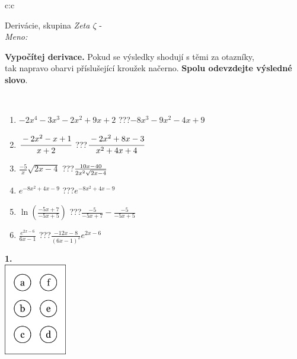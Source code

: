 \documentclass[10pt]{report}
\begin{document}
\begin{tabular}{c:c}
\begin{minipage}[c][104.5mm][t]{0.5\linewidth}
\begin{center}
\vspace{7mm}
{\huge Derivácie, skupina \textit{Zeta $\zeta$} -}\\[5mm]
\textit{Meno:}\phantom{xxxxxxxxxxxxxxxxxxxxxxxxxxxxxxxxxxxxxxxxxxxxxxxxxxxxxxxxxxxxxxxxx}\\[5mm]
\begin{minipage}{0.95\linewidth}
\begin{center}
\textbf{Vypočítej derivace.} Pokud se výsledky shodují s těmi za otazníky,\\tak napravo obarvi příslušející kroužek načerno. \textbf{Spolu odevzdejte výsledné slovo}.
\end{center}
\end{minipage}
\\[1mm]
\begin{minipage}{0.79\linewidth}
\begin{center}
\begin{varwidth}{\linewidth}
\begin{enumerate}
\normalsize
\item $-2x^4-3x^3-2x^2+9x+2$\quad \dotfill\; ???\;\dotfill \quad $-8x^3-9x^2-4x+9$
\item $\cfrac{-2x^2-x+1}{x+2}$\quad \dotfill\; ???\;\dotfill \quad $\cfrac{-2x^2+8x-3}{x^2+4x+4}$
\item $\frac{-5}{x}\sqrt{2x-4}$\quad \dotfill\; ???\;\dotfill \quad $\frac{10x-40}{2x^2 \sqrt{\smash[b]{2x-4}}}$
\item $e^{-8x^2+4x-9}$\quad \dotfill\; ???\;\dotfill \quad $e^{-8x^2+4x-9}$
\item $\ln{\left(\frac{-5x+7}{-5x+5}\right)}$\quad \dotfill\; ???\;\dotfill \quad $\frac{-5}{-5x+7}-\frac{-5}{-5x+5}$
\item $\frac{e^{2x-6}}{6x-1}$\quad \dotfill\; ???\;\dotfill \quad $\frac{-12x-8}{(6x-1)^2}e^{2x-6}$
\end{enumerate}
\end{varwidth}
\end{center}
\end{minipage}
\begin{minipage}{0.20\linewidth}
\begin{center}
{\Huge\bfseries 1.} \\[2mm]
\includegraphics[height=40mm]{../images/braille.png}

\end{center}
\end{minipage}
\end{center}
\end{minipage}
\end{tabular}
\end{document}
